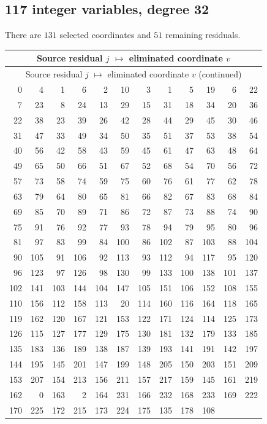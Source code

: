 \documentclass[11pt,letterpaper]{article}
\theoremstyle{definition}
\theoremstyle{remark}
\begin{document}
\subsection{117 integer variables, degree 32}
There are $131$ selected coordinates and $51$ remaining residuals.
\begingroup
\small
\setlength{\tabcolsep}{4pt}
\begin{longtable}{*{6}{r@{\,$\mapsto$\,}r}}
\hline
\multicolumn{12}{c}{Source residual $j$ $\mapsto$ eliminated coordinate $v$}\\
\hline
\endfirsthead
\hline
\multicolumn{12}{c}{Source residual $j$ $\mapsto$ eliminated coordinate $v$ (continued)}\\
\hline
\endhead
0 & 4 & 1 & 6 & 2 & 10 & 3 & 1 & 5 & 19 & 6 & 22 \\
7 & 23 & 8 & 24 & 13 & 29 & 15 & 31 & 18 & 34 & 20 & 36 \\
22 & 38 & 23 & 39 & 26 & 42 & 28 & 44 & 29 & 45 & 30 & 46 \\
31 & 47 & 33 & 49 & 34 & 50 & 35 & 51 & 37 & 53 & 38 & 54 \\
40 & 56 & 42 & 58 & 43 & 59 & 45 & 61 & 47 & 63 & 48 & 64 \\
49 & 65 & 50 & 66 & 51 & 67 & 52 & 68 & 54 & 70 & 56 & 72 \\
57 & 73 & 58 & 74 & 59 & 75 & 60 & 76 & 61 & 77 & 62 & 78 \\
63 & 79 & 64 & 80 & 65 & 81 & 66 & 82 & 67 & 83 & 68 & 84 \\
69 & 85 & 70 & 89 & 71 & 86 & 72 & 87 & 73 & 88 & 74 & 90 \\
75 & 91 & 76 & 92 & 77 & 93 & 78 & 94 & 79 & 95 & 80 & 96 \\
81 & 97 & 83 & 99 & 84 & 100 & 86 & 102 & 87 & 103 & 88 & 104 \\
90 & 105 & 91 & 106 & 92 & 113 & 93 & 112 & 94 & 117 & 95 & 120 \\
96 & 123 & 97 & 126 & 98 & 130 & 99 & 133 & 100 & 138 & 101 & 137 \\
102 & 141 & 103 & 144 & 104 & 147 & 105 & 151 & 106 & 152 & 108 & 155 \\
110 & 156 & 112 & 158 & 113 & 20 & 114 & 160 & 116 & 164 & 118 & 165 \\
119 & 162 & 120 & 167 & 121 & 153 & 122 & 171 & 124 & 114 & 125 & 173 \\
126 & 115 & 127 & 177 & 129 & 175 & 130 & 181 & 132 & 179 & 133 & 185 \\
135 & 183 & 136 & 189 & 138 & 187 & 139 & 193 & 141 & 191 & 142 & 197 \\
144 & 195 & 145 & 201 & 147 & 199 & 148 & 205 & 150 & 203 & 151 & 209 \\
153 & 207 & 154 & 213 & 156 & 211 & 157 & 217 & 159 & 145 & 161 & 219 \\
162 & 0 & 163 & 2 & 164 & 231 & 166 & 232 & 168 & 233 & 169 & 222 \\
170 & 225 & 172 & 215 & 173 & 224 & 175 & 135 & 178 & 108 & \multicolumn{2}{c}{} \\
\hline
\end{longtable}
\endgroup
\end{document}
